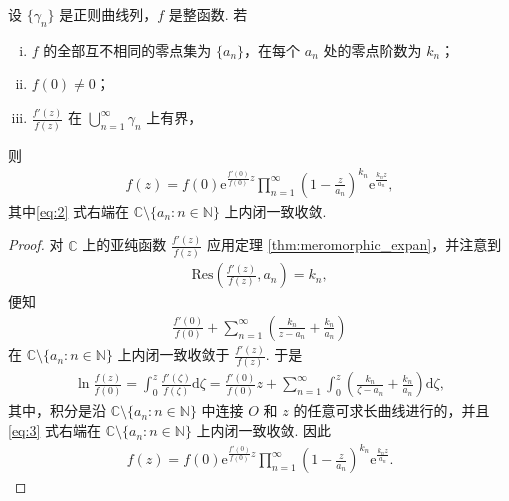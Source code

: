 \documentclass[../../main.tex]{subfiles}%
\begin{document}
\begin{theorem} \label{thm:entire_product}
设 \(\{\gamma_n\}\) 是正则曲线列，\(f\) 是整函数. 若
\begin{enumerate}[(i)]
\item \(f\) 的全部互不相同的零点集为 \(\{a_n\}\)，在每个 \(a_n\) 处的零点阶数为 \(k_n\)；
\item \(f(0) \neq 0\)；
\item \(\frac{f'(z)}{f(z)}\) 在 \(\bigcup\limits_{n=1}^\infty \gamma_n\) 上有界，
\end{enumerate}
则
\begin{align} \label{eq:2}
f(z) = f(0) \mathrm{e}^{\frac{f'(0)}{f(0)} z} \prod_{n=1}^\infty \left( 1 - \frac{z}{a_n} \right)^{k_n} \mathrm{e}^{\frac{k_n z}{a_n}},
\end{align}
其中\eqref{eq:2} 式右端在 \(\mathbb{C} \setminus \{a_n : n \in \mathbb{N}\}\) 上内闭一致收敛.
\end{theorem}
\begin{proof}
对 \(\mathbb{C}\) 上的亚纯函数 \(\frac{f'(z)}{f(z)}\) 应用定理 \cref{thm:meromorphic_expan}，并注意到
\begin{align*}
\mathrm{Res}\left( \frac{f'(z)}{f(z)}, a_n \right) = k_n,
\end{align*}
便知
\begin{align*}
\frac{f'(0)}{f(0)} + \sum_{n=1}^\infty \left( \frac{k_n}{z-a_n} + \frac{k_n}{a_n} \right)
\end{align*}
在 \(\mathbb{C} \setminus \{a_n : n \in \mathbb{N}\}\) 上内闭一致收敛于 \(\frac{f'(z)}{f(z)}\). 于是
\begin{align} \label{eq:3}
\ln \frac{f(z)}{f(0)} = \int_0^z \frac{f'(\zeta)}{f(\zeta)} \mathrm{d}\zeta = \frac{f'(0)}{f(0)} z + \sum_{n=1}^\infty \int_0^z \left( \frac{k_n}{\zeta - a_n} + \frac{k_n}{a_n} \right) \mathrm{d}\zeta,
\end{align}
其中，积分是沿 \(\mathbb{C} \setminus \{a_n : n \in \mathbb{N}\}\) 中连接 \(O\) 和 \(z\) 的任意可求长曲线进行的，并且 \eqref{eq:3} 式右端在 \(\mathbb{C} \setminus \{a_n : n \in \mathbb{N}\}\) 上内闭一致收敛. 因此
\begin{align*}
f(z) = f(0) \mathrm{e}^{\frac{f'(0)}{f(0)} z} \prod_{n=1}^\infty \left( 1 - \frac{z}{a_n} \right)^{k_n} \mathrm{e}^{\frac{k_n z}{a_n}}.
\end{align*}
\end{proof}
\end{document}
